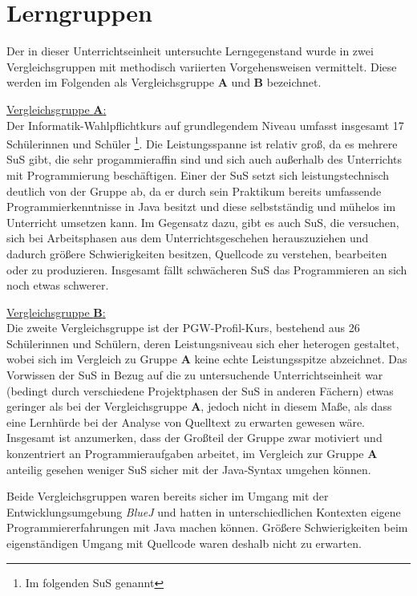 \documentclass[paper=a4, DIV=13, BCOR=12mm, twoside=on, onecolumn=on, open = any, titlepage =on, parskip =half-, headsepline = on, footsepline = on, chapterprefix = on, sectionprefix = on, appendixprefix = off, fontsize = 11pt, numbers = noenddot, abstract = off]{scrreprt}
\begin{document}
\par \singlespacing
 \section{Lerngruppen}
\onehalfspacing
Der in dieser Unterrichtseinheit untersuchte Lerngegenstand wurde in zwei Vergleichsgruppen mit methodisch variierten Vorgehensweisen vermittelt. Diese werden im Folgenden als Vergleichsgruppe \textsc{\textbf{A}} und \textsc{\textbf{B}} bezeichnet.


\underline{Vergleichsgruppe \textsc{\textbf{A}}:}\\
Der Informatik-Wahlpflichtkurs auf grundlegendem Niveau umfasst insgesamt 17 Schülerinnen und Schüler \footnote[1]{Im folgenden SuS genannt}. Die Leistungsspanne ist relativ groß, da es mehrere SuS gibt, die sehr progammieraffin sind und sich auch außerhalb des Unterrichts mit Programmierung beschäftigen. Einer der SuS setzt sich leistungstechnisch deutlich von der Gruppe ab, da er durch sein Praktikum bereits umfassende Programmierkenntnisse in Java besitzt und diese selbstständig und mühelos im Unterricht umsetzen kann. Im Gegensatz dazu, gibt es auch SuS, die versuchen, sich bei Arbeitsphasen aus dem Unterrichtsgeschehen herauszuziehen und dadurch größere Schwierigkeiten besitzen, Quellcode zu verstehen, bearbeiten oder zu produzieren. Insgesamt fällt schwächeren SuS das Programmieren an sich noch etwas schwerer.

\underline{Vergleichsgruppe \textsc{\textbf{B}}:}\\
Die zweite Vergleichsgruppe ist der PGW-Profil-Kurs, bestehend aus 26 Schülerinnen und Schülern, deren Leistungsniveau sich eher heterogen gestaltet, wobei sich im Vergleich zu Gruppe \textsc{\textbf{A}} keine echte Leistungsspitze abzeichnet. Das Vorwissen der SuS in Bezug auf die zu untersuchende Unterrichtseinheit war (bedingt durch verschiedene Projektphasen der SuS in anderen Fächern) etwas geringer als bei der Vergleichsgruppe \textsc{\textbf{A}}, jedoch nicht in diesem Maße, als dass eine Lernhürde bei der Analyse von Quelltext zu erwarten gewesen wäre. Insgesamt ist anzumerken, dass der Großteil der Gruppe zwar motiviert und konzentriert an Programmieraufgaben arbeitet, im Vergleich zur Gruppe \textsc{\textbf{A}} anteilig gesehen weniger SuS sicher mit der Java-Syntax umgehen können. 

Beide Vergleichsgruppen waren bereits sicher im Umgang mit der Entwicklungsumgebung \emph{BlueJ} und hatten in unterschiedlichen Kontexten eigene Programmiererfahrungen mit Java machen können. Größere Schwierigkeiten beim eigenständigen Umgang mit Quellcode waren deshalb nicht zu erwarten.
\end{document}
